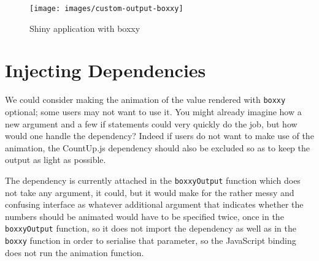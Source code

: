 \documentclass[10pt,]{krantz}
\makeatletter
\newenvironment{Shaded}{\begin{snugshade}}{\end{snugshade}}
\newcommand{\CommentTok}[1]{\textcolor[rgb]{0.37,0.37,0.37}{\textit{#1}}}
\newcommand{\ControlFlowTok}[1]{\textcolor[rgb]{0.27,0.27,0.27}{\textbf{#1}}}
\newcommand{\DataTypeTok}[1]{\textcolor[rgb]{0.27,0.27,0.27}{#1}}
\newcommand{\DecValTok}[1]{\textcolor[rgb]{0.06,0.06,0.06}{#1}}
\newcommand{\KeywordTok}[1]{\textcolor[rgb]{0.27,0.27,0.27}{\textbf{#1}}}
\newcommand{\NormalTok}[1]{#1}
\newcommand{\OperatorTok}[1]{\textcolor[rgb]{0.43,0.43,0.43}{\textbf{#1}}}
\newcommand{\OtherTok}[1]{\textcolor[rgb]{0.37,0.37,0.37}{#1}}
\newcommand{\StringTok}[1]{\textcolor[rgb]{0.5,0.5,0.5}{#1}}
\newenvironment{kframe}{%
\medskip{}
\setlength{\fboxsep}{.8em}
 \def\at@end@of@kframe{}%
 \ifinner\ifhmode%
  \def\at@end@of@kframe{\end{minipage}}%
  \begin{minipage}{\columnwidth}%
 \fi\fi%
 \def\FrameCommand##1{\hskip\@totalleftmargin \hskip-\fboxsep
 \colorbox{shadecolor}{##1}\hskip-\fboxsep
     \hskip-\linewidth \hskip-\@totalleftmargin \hskip\columnwidth}%
 \MakeFramed {\advance\hsize-\width
   \@totalleftmargin\z@ \linewidth\hsize
   \@setminipage}}%
 {\par\unskip\endMakeFramed%
 \at@end@of@kframe}
\renewenvironment{Shaded}{\begin{kframe}}{\end{kframe}}
\makeatother
\begin{document}
\begin{figure}[H]

{\centering \texttt{[image: images/custom-output-boxxy]} 

}

\caption{Shiny application with boxxy}\label{fig:boxxy-custom}
\end{figure}

\hypertarget{shiny-output-inject}{%
\section{Injecting Dependencies}\label{shiny-output-inject}}

We could consider making the animation of the value rendered with \texttt{boxxy} optional; some users may not want to use it. You might already imagine how a new argument and a few if statements could very quickly do the job, but how would one handle the dependency? Indeed if users do not want to make use of the animation, the CountUp.js dependency should also be excluded so as to keep the output as light as possible.

The dependency is currently attached in the \texttt{boxxyOutput} function which does not take any argument, it could, but it would make for the rather messy and confusing interface as whatever additional argument that indicates whether the numbers should be animated would have to be specified twice, once in the \texttt{boxxyOutput} function, so it does not import the dependency as well as in the \texttt{boxxy} function in order to serialise that parameter, so the JavaScript binding does not run the animation function.

\begin{Shaded}
\end{Shaded}
\end{document}
